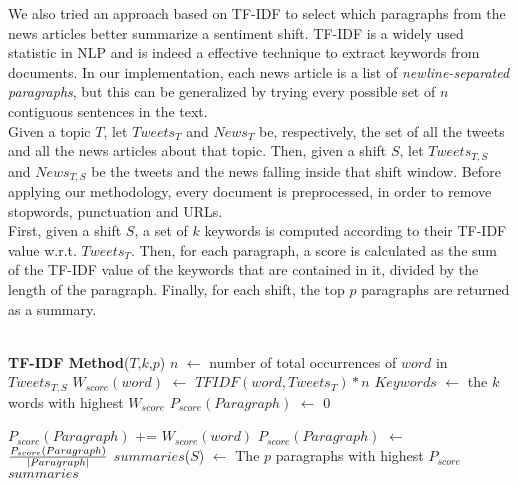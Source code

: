 We also tried an approach based on TF-IDF to select which paragraphs from the news articles better summarize a sentiment shift. TF-IDF is a widely used statistic in NLP and is indeed a effective technique to extract keywords from documents. In our implementation, each news article is a list of \emph{newline-separated paragraphs}, but this can be generalized by trying every possible set of $n$ contiguous sentences in the text.
\\
Given a topic $T$, let $Tweets_T$ and $News_T$ be, respectively, the set of all the tweets and all the news articles about that topic. Then, given a shift $S$, let $Tweets_{T,S}$ and $News_{T,S}$ be the tweets and the news falling inside that shift window. Before applying our methodology, every document is preprocessed, in order to remove stopwords, punctuation and URLs.
\\
First, given a shift $S$, a set of $k$ keywords is computed according to their TF-IDF value w.r.t. $Tweets_T$. Then, for each paragraph, a score is calculated as the sum of the TF-IDF value of the keywords that are contained in it, divided by the length of the paragraph. Finally, for each shift, the top $p$ paragraphs are returned as a summary.
\\\\
\begin{algorithmic}
\STATE \textbf{TF-IDF Method}($T$,$k$,$p$)
\STATE
{}
		\STATE $n$ $\leftarrow$ number of total occurrences of $word$ in $Tweets_{T,S}$
		\STATE $W_{score}(word)$ $\leftarrow$ $TFIDF(word,Tweets_T) * n$
	\ENDFOR
	\STATE
	\STATE $Keywords$ $\leftarrow$ the $k$ words with highest $W_{score}$
	\STATE
			\STATE $P_{score}(Paragraph)$ $\leftarrow$ $0$

					\STATE $P_{score}(Paragraph)$ += $W_{score}(word)$
				\ENDIF
			\ENDFOR
			\STATE $P_{score}(Paragraph)$ $\leftarrow$ ${P_{score}(Paragraph) \over |Paragraph|}$
		\ENDFOR
	\ENDFOR
	\STATE
	\STATE $summaries$($S$) $\leftarrow$ The $p$ paragraphs with highest $P_{score}$
\ENDFOR
\STATE
\RETURN $summaries$


\end{algorithmic}